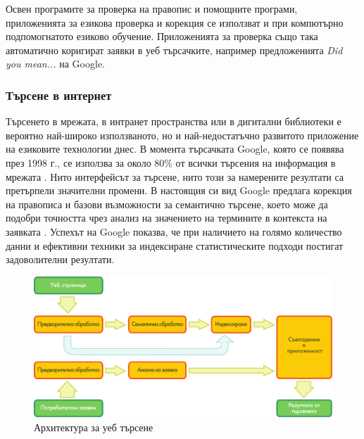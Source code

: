 \documentclass[]{../../metanetpaper}
\begin{document}
\begin{multicols}{2}

Освен програмите за проверка на правопис и помощните програми, приложенията за езикова проверка и корекция се използват и при компютърно подпомогнатото езиково обучение. Приложенията за проверка също така автоматично коригират заявки в уеб търсачките, например предложенията \textit{Did you mean...} на Google.

\subsubsection{Търсене в интернет}

Търсенето в мрежата, в интранет пространства или в дигитални библиотеки е вероятно най-широко използваното, но и най-недостатъчно развитото приложение на езиковите технологии днес. 
В момента търсачката Google, която се
 появява през 1998 г., се използва за около 80\% от всички търсения на информация в мрежата \cite{spi1}. 
Нито интерфейсът за търсене, нито този за
 намерените резултати са претърпели значителни
 промени. В настоящия си
 вид Google предлага корекция на правописа и
базови възможности за семантично търсене, което може да подобри
 точността чрез анализ на значението на
 термините в контекста на заявката  \cite{pc1}. Успехът на Google
 показва, че при наличието на голямо количество данни и ефективни
 техники за индексиране статистическите
 подходи постигат задоволителни резултати.

\begin{figure}[htb]
  \center
  \includegraphics[width=\textwidth]{../_media/bulgarian/web_search_architecture}
  \vspace{-5mm}
  \caption{Архитектура за уеб търсене}
  \label{fig:websearcharch_de}
\end{figure}


\end{multicols}
\end{document}
